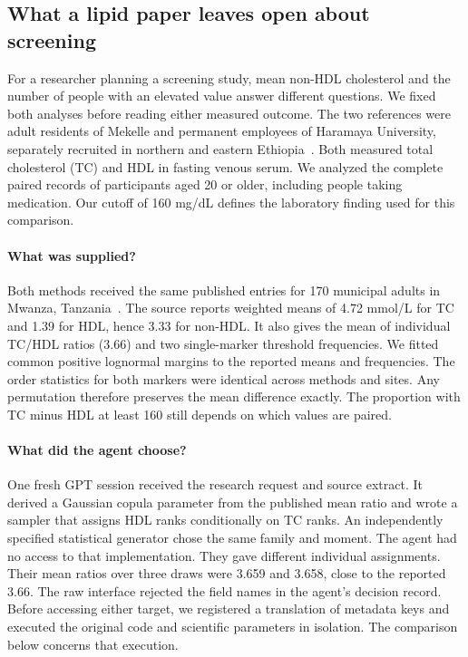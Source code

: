 \documentclass[sigconf,anonymous,review]{acmart}
\begin{document}
\subsection{What a lipid paper leaves open about screening}
\label{sec:nonhdl}
For a researcher planning a screening study, mean non-HDL cholesterol and the number of people with an elevated value answer different questions. We fixed both analyses before reading either measured outcome. The two references were adult residents of Mekelle and permanent employees of Haramaya University, separately recruited in northern and eastern Ethiopia~\cite{mekelle,haramaya}. Both measured total cholesterol (TC) and HDL in fasting venous serum. We analyzed the complete paired records of participants aged 20 or older, including people taking medication. Our cutoff of 160 mg/dL defines the laboratory finding used for this comparison.

\paragraph{What was supplied?}
Both methods received the same published entries for 170 municipal adults in Mwanza, Tanzania~\cite{kavishe}. The source reports weighted means of 4.72 mmol/L for TC and 1.39 for HDL, hence 3.33 for non-HDL. It also gives the mean of individual TC/HDL ratios (3.66) and two single-marker threshold frequencies. We fitted common positive lognormal margins to the reported means and frequencies. The order statistics for both markers were identical across methods and sites. Any permutation therefore preserves the mean difference exactly. The proportion with TC minus HDL at least 160 still depends on which values are paired.

\paragraph{What did the agent choose?}
One fresh GPT session received the research request and source extract. It derived a Gaussian copula parameter from the published mean ratio and wrote a sampler that assigns HDL ranks conditionally on TC ranks. An independently specified statistical generator chose the same family and moment. The agent had no access to that implementation. They gave different individual assignments. Their mean ratios over three draws were 3.659 and 3.658, close to the reported 3.66. The raw interface rejected the field names in the agent's decision record. Before accessing either target, we registered a translation of metadata keys and executed the original code and scientific parameters in isolation. The comparison below concerns that execution.
\end{document}
